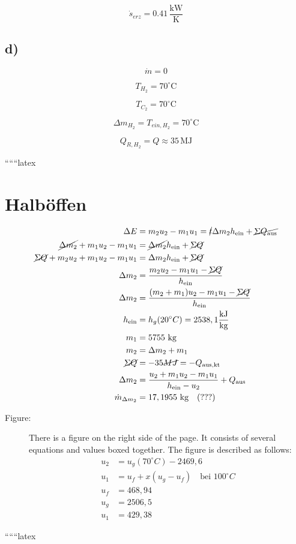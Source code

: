 \[
\dot{s}_{erz} = 0.41 \, \frac{\text{kW}}{\text{K}}
\]

\subsection*{d)}
\[
\dot{m} = 0
\]

\[
T_{H_2} = 70^\circ \text{C}
\]

\[
T_{C_2} = 70^\circ \text{C}
\]

\[
\Delta m_{H_2} = T_{ein, H_2} = 70^\circ \text{C}
\]

\[
Q_{R, H_2} = Q \approx 35 \, \text{MJ}
\]

``````latex


\section*{Halböffen}

\begin{align*}
\Delta E &= m_2 u_2 - m_1 u_1 = \cancel{t} \Delta m_2 h_{\text{ein}} + \cancel{\Sigma Q_{\text{aus}}} \\
\cancel{\Delta m_2} + m_1 u_2 - m_1 u_1 &= \cancel{\Delta m_2} h_{\text{ein}} + \cancel{\Sigma Q} \\
\cancel{\Sigma Q} + m_2 u_2 + m_1 u_2 - m_1 u_1 &= \Delta m_2 h_{\text{ein}} + \cancel{\Sigma Q} \\
\Delta m_2 &= \frac{m_2 u_2 - m_1 u_1 - \cancel{\Sigma Q}}{h_{\text{ein}}} \\
\Delta m_2 &= \frac{(m_2 + m_1) u_2 - m_1 u_1 - \cancel{\Sigma Q}}{h_{\text{ein}}} \\
h_{\text{ein}} &= h_g(20^\circ C) = 2538,1 \frac{\text{kJ}}{\text{kg}} \\
m_1 &= 5755 \text{ kg} \\
m_2 &= \Delta m_2 + m_1 \\
\cancel{\Sigma Q} &= -35 \cancel{MJ} = -Q_{\text{aus,kt}} \\
\Delta m_2 &= \frac{u_2 + m_1 u_2 - m_1 u_1}{h_{\text{ein}} - u_2} + Q_{\text{aus}} \\
\dot{m}_{\Delta m_2} &= 17,1955 \text{ kg} \quad (\text{???})
\end{align*}

\begin{description}
\item[Figure:] There is a figure on the right side of the page. It consists of several equations and values boxed together. The figure is described as follows:
\begin{align*}
u_2 &= u_g(70^\circ C) - 2469,6 \\
u_1 &= u_f + x (u_g - u_f) \quad \text{bei } 100^\circ C \\
u_f &= 468,94 \\
u_g &= 2506,5 \\
u_1 &= 429,38
\end{align*}
\end{description}

``````latex


